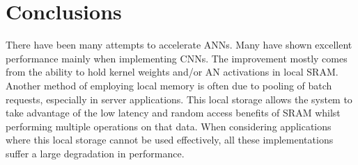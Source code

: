 \documentclass[journal]{IEEEtran}
\begin{document}


\section{Conclusions}
\label{sec:Conclusions}
There have been many attempts to accelerate ANNs. Many have shown excellent performance mainly when implementing CNNs. The improvement mostly comes from the ability to 
hold kernel weights and/or AN activations in local SRAM. Another method of employing local memory is often due to pooling of batch requests, especially in server applications.
This local storage allows the system to take advantage of the low latency and random access benefits of SRAM whilst performing multiple operations on that data.
When considering applications where this local storage cannot be used effectively, all these implementations suffer a large degradation in performance.
\end{document}
